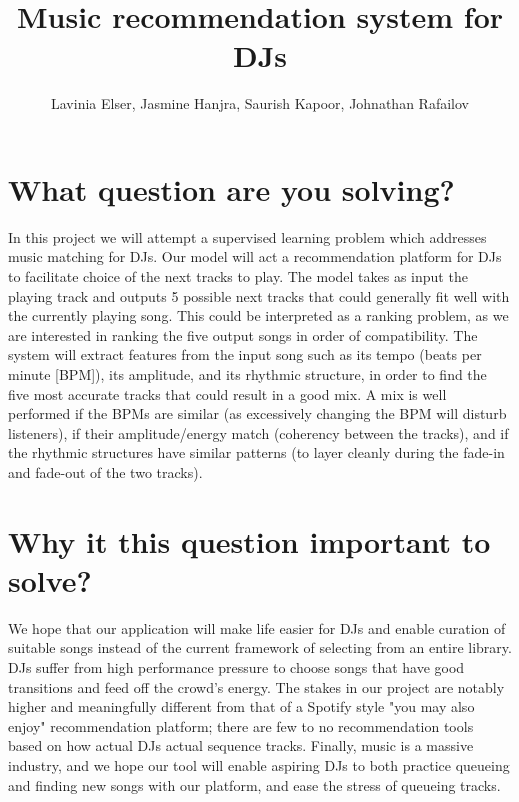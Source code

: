 \documentclass[10pt]{article}
\begin{document}
\title{\vspace{-2cm} Music recommendation system for DJs }
\author{Lavinia Elser, Jasmine Hanjra, Saurish Kapoor, Johnathan Rafailov}
\maketitle

\section{What question are you solving?}


In this project we will attempt a supervised learning problem which addresses music matching for DJs. Our model will act a recommendation platform for DJs to facilitate choice of the next tracks to play. The model takes as input the playing track and outputs 5 possible next tracks that could generally fit well with the currently playing song. This could be interpreted as a ranking problem, as we are interested in ranking the five output songs in order of compatibility. The system will extract features from the input song such as its tempo (beats per minute [BPM]), its amplitude, and its rhythmic structure, in order to find the five most accurate tracks that could result in a good mix. A mix is well performed if the BPMs are similar (as excessively changing the BPM will disturb listeners),  if their amplitude/energy match (coherency between the tracks), and if the rhythmic structures have similar patterns (to layer cleanly during the fade-in and fade-out of the two tracks).

\section{Why it this question important to solve?}

We hope that our application will make life easier for DJs and enable curation of suitable songs instead of the current framework of selecting from an entire library. DJs suffer from high performance pressure to choose songs that have good transitions and feed off the crowd's energy. The stakes in our project are notably higher and meaningfully different from that of a Spotify style "you may also enjoy" recommendation platform; there are few to no recommendation tools based on how actual DJs actual sequence tracks. Finally, music is a massive industry, and we hope our tool will enable aspiring DJs to both practice queueing and finding new songs with our platform, and ease the stress of queueing tracks. 
\end{document}
